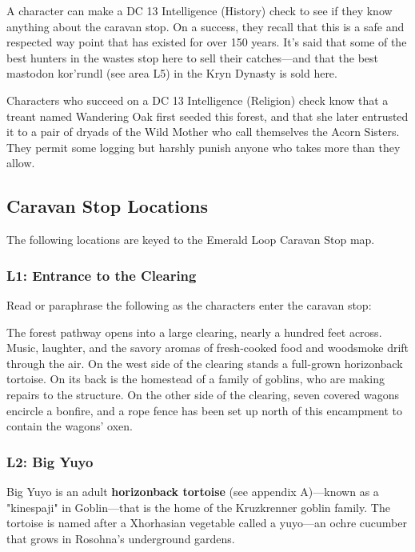 \documentclass[10pt,a4paper,twoside,fancy,bg=print,twocolumn,openany,nodeprecatedcode]{dndbook}
\begin{document}
A character can make a DC 13 Intelligence (History) check to see if they know anything about the caravan stop. On a success, they recall that this is a safe and respected way point that has existed for over 150 years. It's said that some of the best hunters in the wastes stop here to sell their catches—and that the best mastodon kor'rundl (see area L5) in the Kryn Dynasty is sold here.

Characters who succeed on a DC 13 Intelligence (Religion) check know that a treant named Wandering Oak first seeded this forest, and that she later entrusted it to a pair of dryads of the Wild Mother who call themselves the Acorn Sisters. They permit some logging but harshly punish anyone who takes more than they allow.

\subsection{Caravan Stop Locations}
The following locations are keyed to the Emerald Loop Caravan Stop map.

\subsubsection{L1: Entrance to the Clearing}
Read or paraphrase the following as the characters enter the caravan stop:

\begin{DndReadAloud}{}
The forest pathway opens into a large clearing, nearly a hundred feet across. Music, laughter, and the savory aromas of fresh-cooked food and woodsmoke drift through the air. On the west side of the clearing stands a full-grown horizonback tortoise. On its back is the homestead of a family of goblins, who are making repairs to the structure. On the other side of the clearing, seven covered wagons encircle a bonfire, and a rope fence has been set up north of this encampment to contain the wagons' oxen.

\end{DndReadAloud}

\subsubsection{L2: Big Yuyo}
Big Yuyo is an adult \textbf{horizonback tortoise} (see appendix A)—known as a "kinespaji" in Goblin—that is the home of the Kruzkrenner goblin family. The tortoise is named after a Xhorhasian vegetable called a yuyo—an ochre cucumber that grows in Rosohna's underground gardens.
\end{document}
